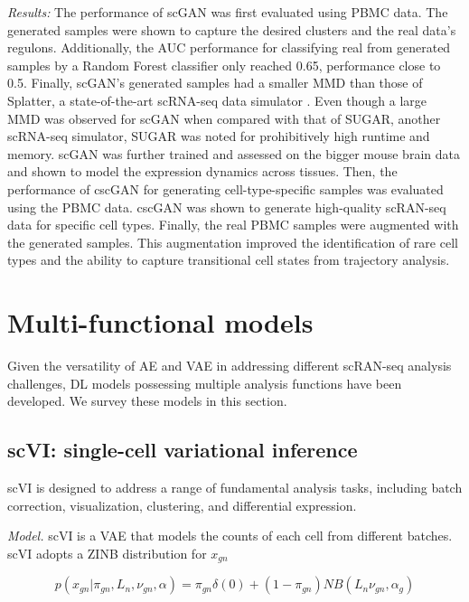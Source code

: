 \documentclass[
]{book}
\begin{document}
\emph{Results:} The performance of scGAN was first evaluated using PBMC data. The generated samples were shown to capture the desired clusters and the real data's regulons. Additionally, the AUC performance for classifying real from generated samples by a Random Forest classifier only reached 0.65, performance close to 0.5. Finally, scGAN's generated samples had a smaller MMD than those of Splatter, a state-of-the-art scRNA-seq data simulator \citep{RN190}. Even though a large MMD was observed for scGAN when compared with that of SUGAR, another scRNA-seq simulator, SUGAR \citep{RN141} was noted for prohibitively high runtime and memory. scGAN was further trained and assessed on the bigger mouse brain data and shown to model the expression dynamics across tissues. Then, the performance of cscGAN for generating cell-type-specific samples was evaluated using the PBMC data. cscGAN was shown to generate high-quality scRAN-seq data for specific cell types. Finally, the real PBMC samples were augmented with the generated samples. This augmentation improved the identification of rare cell types and the ability to capture transitional cell states from trajectory analysis.

\hypertarget{ch-5-4}{%
\section{Multi-functional models}\label{ch-5-4}}

Given the versatility of AE and VAE in addressing different scRAN-seq analysis challenges, DL models possessing multiple analysis functions have been developed. We survey these models in this section.

\hypertarget{ch-5-4-1}{%
\subsection{scVI: single-cell variational inference}\label{ch-5-4-1}}

scVI \citep{RN88} is designed to address a range of fundamental analysis tasks, including batch correction, visualization, clustering, and differential expression.

\emph{Model.} scVI is a VAE that models the counts of each cell from different batches. scVI adopts a ZINB distribution for \(x_{gn}\)

\begin{equation}
p(x_{gn}\vert \pi_{gn},L_{n},\nu_{gn},\alpha) = \pi_{gn}\delta(0)+(1-\pi_{gn})NB(L_{n}\nu_{gn},\alpha_{g}) \label{eq:eq31}
\end{equation}
\end{document}
